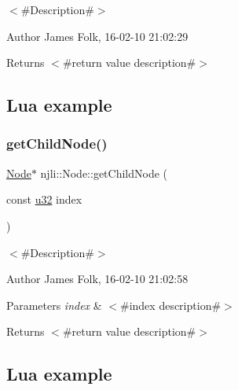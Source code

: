 $<$\#\+Description\#$>$ 

\begin{DoxyAuthor}{Author}
James Folk, 16-\/02-\/10 21\+:02\+:29
\end{DoxyAuthor}
\begin{DoxyReturn}{Returns}
$<$\#return value description\#$>$
\end{DoxyReturn}
\hypertarget{classnjli_1_1_steering_behavior_wander_ex1}{}\subsection{Lua example}\label{classnjli_1_1_steering_behavior_wander_ex1}

\begin{DoxyCodeInclude}
\end{DoxyCodeInclude}
\mbox{\label{classnjli_1_1_node_a2c324ab68a85fda11dd1c9e324de9f5d}} 
\subsubsection{\texorpdfstring{get\+Child\+Node()}{getChildNode()}\hspace{0.1cm}{\footnotesize\ttfamily [1/2]}}
{\footnotesize\ttfamily \mbox{\hyperlink{classnjli_1_1_node}{Node}}$\ast$ njli\+::\+Node\+::get\+Child\+Node (\begin{DoxyParamCaption}\item[{const \mbox{\hyperlink{_util_8h_a10e94b422ef0c20dcdec20d31a1f5049}{u32}}}]{index }\end{DoxyParamCaption})}



$<$\#\+Description\#$>$ 

\begin{DoxyAuthor}{Author}
James Folk, 16-\/02-\/10 21\+:02\+:58
\end{DoxyAuthor}

\begin{DoxyParams}{Parameters}
{\em index} & $<$\#index description\#$>$\\
\hline
\end{DoxyParams}
\begin{DoxyReturn}{Returns}
$<$\#return value description\#$>$
\end{DoxyReturn}
\hypertarget{classnjli_1_1_steering_behavior_wander_ex1}{}\subsection{Lua example}\label{classnjli_1_1_steering_behavior_wander_ex1}

